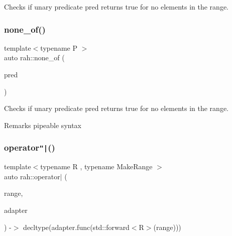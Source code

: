 Checks if unary predicate pred returns true for no elements in the range. 


\begin{DoxyCodeInclude}{0}
\DoxyCodeLine{        ));}
\end{DoxyCodeInclude}
\mbox{\label{namespacerah_aa05e58774ee8e9e05cd3e6ed2a2fa372}} 
\subsubsection{\texorpdfstring{none\_of()}{none\_of()}\hspace{0.1cm}{\footnotesize\ttfamily [2/2]}}
{\footnotesize\ttfamily template$<$typename P $>$ \\
auto rah\+::none\+\_\+of (\begin{DoxyParamCaption}\item[{P \&\&}]{pred }\end{DoxyParamCaption})}



Checks if unary predicate pred returns true for no elements in the range. 

\begin{DoxyRemark}{Remarks}
pipeable syntax
\end{DoxyRemark}

\begin{DoxyCodeInclude}{0}
\DoxyCodeLine{        ) == \textcolor{keyword}{false});}
\end{DoxyCodeInclude}
\mbox{\label{namespacerah_a5ebb23bb276c853ef14a86bed84b6df9}} 
\subsubsection{\texorpdfstring{operator\texttt{"|}()}{operator|()}}
{\footnotesize\ttfamily template$<$typename R , typename Make\+Range $>$ \\
auto rah\+::operator$\vert$ (\begin{DoxyParamCaption}\item[{R \&\&}]{range,  }\item[{\mbox{\hyperlink{structrah_1_1pipeable}{pipeable}}$<$ Make\+Range $>$ const \&}]{adapter }\end{DoxyParamCaption}) -\/$>$ decltype(adapter.\+func(std\+::forward$<$R$>$(range)))
}

